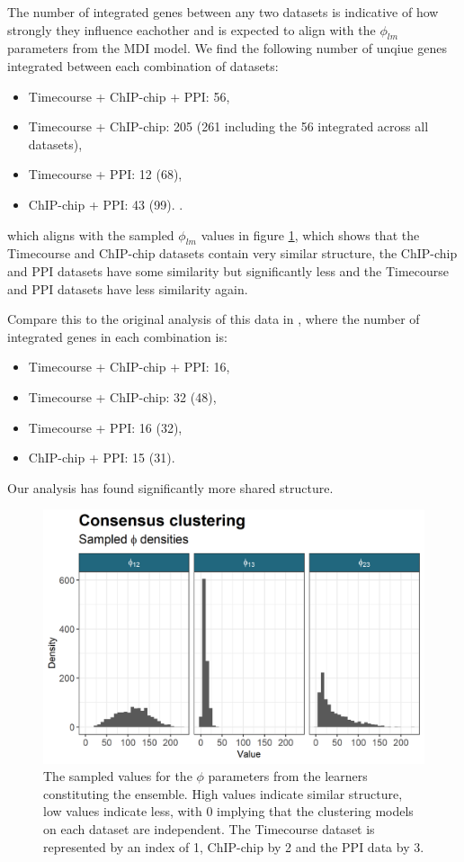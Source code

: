 \documentclass[]{article}
\begin{document}
The number of integrated genes between any two datasets is indicative of how strongly they influence eachother and is expected to align with the $\phi_{lm}$ parameters from the MDI model. We find the following number of unqiue genes integrated between each combination of datasets:
\begin{itemize}	
	\item Timecourse + ChIP-chip + PPI: 56,
	\item Timecourse + ChIP-chip: 205 (261 including the 56 integrated across all datasets),
	\item Timecourse + PPI: 12 (68),
	\item ChIP-chip + PPI: 43 (99).
.
\end{itemize}
which aligns with the sampled $\phi_{lm}$ values in figure \ref{fig:ccPhiDensities}, which shows that the Timecourse and ChIP-chip datasets contain very similar structure, the ChIP-chip and PPI datasets have some similarity but significantly less and the Timecourse and PPI datasets have less similarity again. 

Compare this to the original analysis of this data in \cite{kirk2012bayesian}, where the number of integrated genes in each combination is:

\begin{itemize}
	\item Timecourse + ChIP-chip + PPI: 16,
	\item Timecourse + ChIP-chip: 32 (48),
	\item Timecourse + PPI: 16 (32),
	\item ChIP-chip + PPI: 15 (31).
\end{itemize}
Our analysis has found significantly more shared structure.

\begin{figure}
	\centering
	\includegraphics[scale=0.8]{./Images/Yeast/Convergence/CCPhiDensityPlot.png}
	\caption{The sampled values for the $\phi$ parameters from the learners constituting the ensemble. High values indicate similar structure, low values indicate less, with 0 implying that the clustering models on each dataset are independent. The Timecourse dataset is represented by an index of 1, ChIP-chip by 2 and the PPI data by 3.}
	\label{fig:ccPhiDensities}
\end{figure}
\end{document}
